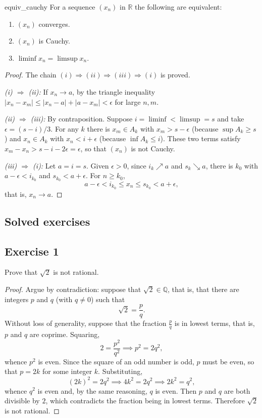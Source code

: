 \documentclass[11pt, a4paper]{article}
\begin{document}
\begin{teorema}{}{equiv_cauchy}
For a sequence $(x_n)$ in $\mathbb{R}$ the following are equivalent:
\begin{enumerate}
    \item[i)] $(x_n)$ converges.
    \item[ii)] $(x_n)$ is Cauchy.
    \item[iii)] $\liminf x_n = \limsup x_n$.
\end{enumerate}
\end{teorema}

\begin{proof}
The chain $(i) \Rightarrow (ii) \Rightarrow (iii) \Rightarrow (i)$ is proved.

\textit{(i) $\Rightarrow$ (ii):} If $x_n \to a$, by the triangle inequality
$|x_n - x_m| \le |x_n - a| + |a - x_m| < \epsilon$ for large $n, m$.

\textit{(ii) $\Rightarrow$ (iii):} By contraposition. Suppose $i = \liminf < \limsup = s$ and
take $\epsilon = (s-i)/3$. For any $k$ there is $x_m \in A_k$ with $x_m > s - \epsilon$ (because
$\sup A_k \ge s$) and $x_n \in A_k$ with $x_n < i + \epsilon$ (because $\inf A_k \le i$). These two
terms satisfy $x_m - x_n > s - i - 2\epsilon = \epsilon$, so that $(x_n)$ is not Cauchy.

\textit{(iii) $\Rightarrow$ (i):} Let $a = i = s$. Given $\epsilon > 0$, since $i_k \nearrow a$ and
$s_k \searrow a$, there is $k_0$ with $a - \epsilon < i_{k_0}$ and $s_{k_0} < a + \epsilon$. For
$n \ge k_0$,
$$ a - \epsilon < i_{k_0} \le x_n \le s_{k_0} < a + \epsilon, $$
that is, $x_n \to a$.
\end{proof}

\newpage

\subsection{Solved exercises}

\subsection*{Exercise 1}

Prove that $\sqrt{2}$ is not rational.

\begin{proof}
Argue by contradiction: suppose that $\sqrt{2} \in \mathbb{Q}$, that is, that there are integers $p$
and $q$ (with $q \neq 0$) such that
$$ \sqrt{2} = \frac{p}{q}. $$
Without loss of generality, suppose that the fraction $\frac{p}{q}$ is in lowest terms, that is, $p$ and $q$
are coprime. Squaring,
$$ 2 = \frac{p^2}{q^2} \implies p^2 = 2q^2, $$
whence $p^2$ is even. Since the square of an odd number is odd, $p$ must be even, so that $p = 2k$ for
some integer $k$. Substituting,
$$ (2k)^2 = 2q^2 \implies 4k^2 = 2q^2 \implies 2k^2 = q^2, $$
whence $q^2$ is even and, by the same reasoning, $q$ is even. Then $p$ and $q$ are both
divisible by $2$, which contradicts the fraction being in lowest terms. Therefore $\sqrt{2}$ is not
rational.
\end{proof}
\end{document}
